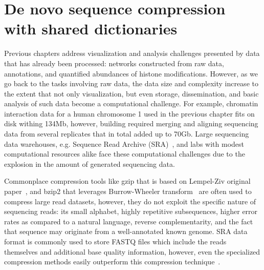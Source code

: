 \documentclass[12pt]{cmuthesis}
\begin{document}

%

\chapter{De novo sequence compression with shared dictionaries}


Previous chapters address visualization and analysis challenges presented by data that has already been processed: networks constructed from raw data, annotations, and quantified abundances of histone modifications. However, as we go back to the tasks involving raw data, the data size and complexity increase to the extent that not only visualization, but even storage, dissemination, and basic analysis of such data become a computational challenge. For example, chromatin interaction data for a human chromosome 1 used in the previous chapter fits on disk withing 134Mb, however, building required merging and aligning sequencing data from several replicates that in total added up to 70Gb. Large sequencing data warehouses, e.g. Sequence Read Archive (SRA)~\cite{SRA}, and labs with modest computational resources alike face these computational challenges due to the explosion in the amount of generated sequencing data.

Commonplace compression tools like gzip that is based on Lempel-Ziv original paper~\cite{LempelZiv77}, and bzip2 that leverages Burrow-Wheeler transform~\cite{BWTransform} are often used to compress large read datasets, however, they do not exploit the specific nature of sequencing reads: its small alphabet, highly repetitive subsequences, higher error rates as compared to a natural language, reverse complementarity, and the fact that sequence may originate from a well-annotated known genome. SRA data format is commonly used to store FASTQ files which include the reads themselves and additional base quality information, however, even the specialized compression methods easily outperform this compression technique~\cite{SeqSqueeze}.
\end{document}
